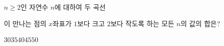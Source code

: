 $n\ge 2$인 자연수 $n$에 대하여 두 곡선 \par\smallskip{}\par\smallskip\noindent 이 만나는 점의 $x$좌표가 $1$보다 크고 $2$보다 작도록 하는 모든 $n$의 값의 합은?
\begin{choices32}{$30$}{$35$}{$40$}{$45$}{$50$}\end{choices32}

